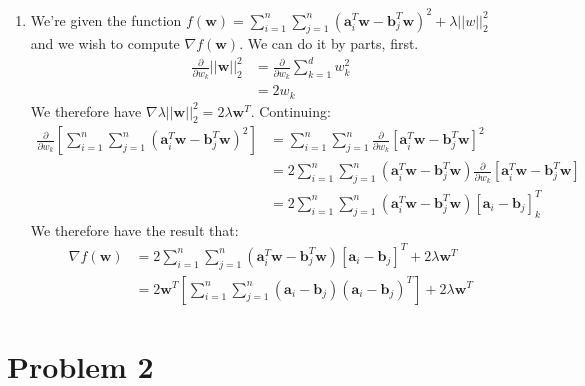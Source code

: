 \documentclass[12pt]{article}
\begin{document}
\begin{enumerate}[label=(\alph*)]
  \item We're given the function $f(\bm{w}) = \sum_{i=1}^n \sum_{j = 1}^n (\bm{a}_i^T\bm{w} - \bm{b}_j^T\bm{w})^2 + \lambda||w||_2^2$ and we wish to compute $\nabla f(\bm{w})$. We can do it by parts, first.
  \begin{align*}
    \frac{\partial}{\partial w_k} ||\bm{w}||_2^2 &= \frac{\partial}{\partial w_k} \sum_{k=1}^d w_k^2 \\
    &= 2w_k \tag{ all terms except $w_k$ are zero}
  \end{align*}
  We therefore have $\nabla \lambda ||\bm{w}||_2^2 = 2\lambda\bm{w}^T$. Continuing:
  \begin{align*}
    \frac{\partial}{\partial w_k}\left[ \sum_{i=1}^n \sum_{j=1}^n (\bm{a}_i^T \bm{w} - \bm{b}_j^T \bm{w})^2 \right] &= \sum_{i=1}^n \sum_{j=1}^n \frac{\partial}{\partial w_k} \left[ \bm{a}_i^T \bm{w} - \bm{b}_j^T \bm{w} \right]^2 \\
    &=  2\sum_{i=1}^n \sum_{j=1}^n (\bm{a}_i^T \bm{w} - \bm{b}_j^T\bm{w})\frac{\partial}{\partial w_k}[\bm{a}_i^T \bm{w} - \bm{b}_j^T \bm {w}] \tag{chain rule} \\
    &= 2 \sum_{i=1}^n \sum_{j=1}^n(\bm{a}_i^T \bm{w} - \bm{b}_j^T \bm{w}) [\bm{a}_i - \bm{b}_j]^T_k
  \end{align*}
  We therefore have the result that:
  \begin{align*}
    \nabla f(\bm{w}) &= 2\sum_{i=1}^n\sum_{j=1}^n (\bm{a}_i^T \bm{w} - \bm{b}_j^T \bm{w})[\bm{a}_i - \bm{b}_j]^T + 2\lambda \bm{w}^T \\
    &= 2\bm{w}^T\left[\sum_{i=1}^n\sum_{j=1}^n (\bm{a}_i - \bm{b}_j)(\bm{a}_i - \bm{b}_j)^T\right] + 2\lambda \bm{w}^T 
  \end{align*}
\end{enumerate}

\section*{Problem 2}
\end{document}
